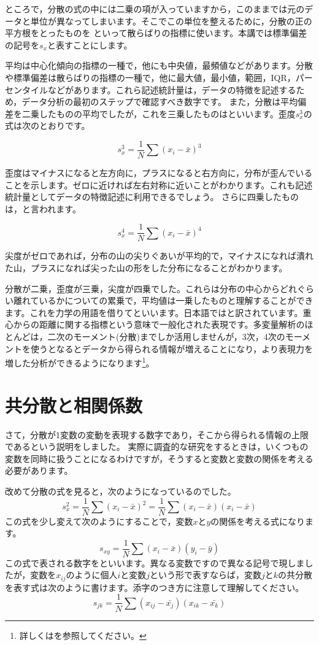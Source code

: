 \documentclass{ltjsbook}
\begin{document}
ところで，分散の式の中には二乗の項が入っていますから，このままでは元のデータと単位が異なってしまいます。そこでこの単位を整えるために，分散の正の平方根をとったものを といって散らばりの指標に使います。本講では標準偏差の記号を$s_x$と表すことにします。

平均は中心化傾向の指標の一種で，他にも中央値，最頻値などがあります。分散や標準偏差は散らばりの指標の一種で，他に最大値，最小値，範囲，IQR，パーセンタイルなどがあります。これら記述統計量は，データの特徴を記述するため，データ分析の最初のステップで確認すべき数字です。
また，分散は平均偏差を二乗したものの平均でしたが，これを三乗したものはといいます。歪度$s_x^3$の式は次のとおりです。

\[ s_x^3 = \frac{1}{N}\sum (x_i - \bar{x})^3 \]

歪度はマイナスになると左方向に，プラスになると右方向に，分布が歪んでいることを示します。ゼロに近ければ左右対称に近いことがわかります。これも記述統計量としてデータの特徴記述に利用できるでしょう。
さらに四乗したものは，と言われます。

\[ s_x^4 = \frac{1}{N}\sum (x_i - \bar{x})^4 \]

尖度がゼロであれば，分布の山の尖りぐあいが平均的で，マイナスになれば潰れた山，プラスになれば尖った山の形をした分布になることがわかります。

分散が二乗，歪度が三乗，尖度が四乗でした。これらは分布の中心からどれぐらい離れているかについての累乗で，平均値は一乗したものと理解することができます。これを力学の用語を借りてといいます。日本語ではと訳されています。重心からの距離に関する指標という意味で一般化された表現です。多変量解析のほとんどは，二次のモーメント(分散)までしか活用しませんが，3次，4次のモーメントを使うとなるとデータから得られる情報が増えることになり，より表現力を増した分析ができるようになります\footnote{詳しくは\textcite{Toyoda2007}を参照してください。}。

\section{共分散と相関係数}
さて，分散が1変数の変動を表現する数字であり，そこから得られる情報の上限であるという説明をしました。
実際に調査的な研究をするときは，いくつもの変数を同時に扱うことになるわけですが，そうすると変数と変数の関係を考える必要があります。

改めて分散の式を見ると，次のようになっているのでした。
\[  s_x^2 = \frac{1}{N}\sum (x_i - \bar{x})^2 = \frac{1}{N}\sum (x_i - \bar{x})(x_i - \bar{x}) \]
この式を少し変えて次のようにすることで，変数$x$と$y$の関係を考える式になります。
\[ s_{xy} = \frac{1}{N} \sum(x_i-\bar{x})(y_i-\bar{y})\]
この式で表される数字をといいます。異なる変数ですので異なる記号で現しましたが，変数を$x_{ij}$のように個人$i$と変数$j$という形で表すならば，変数$j$と$k$の共分散を表す式は次のように書けます。添字のつき方に注意して理解してください。
\[ s_{jk} = \frac{1}{N} \sum (x_{ij} - \bar{x_j})(x_{ik} - \bar{x_k}) \]
\end{document}
